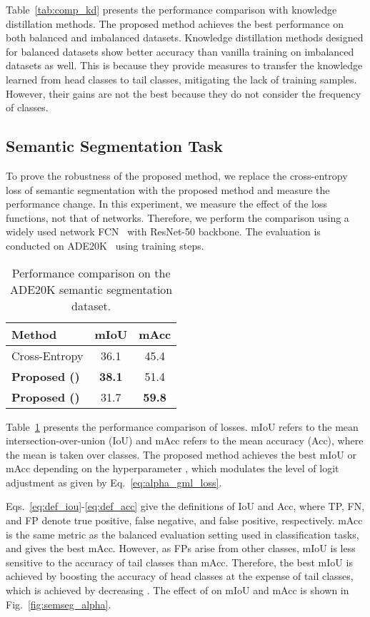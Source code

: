 \documentclass{article}
\theoremstyle{plain}
\theoremstyle{definition}
\theoremstyle{remark}
\begin{document}
Table~\ref{tab:comp_kd} presents the performance comparison with knowledge distillation methods. The proposed method achieves the best performance on both balanced and imbalanced datasets. Knowledge distillation methods designed for balanced datasets show better accuracy than vanilla training on imbalanced datasets as well. This is because they provide measures to transfer the knowledge learned from head classes to tail classes, mitigating the lack of training samples. However, their gains are not the best because they do not consider the frequency of classes.


\subsection{Semantic Segmentation Task}

To prove the robustness of the proposed method, we replace the cross-entropy loss of semantic segmentation with the proposed method and measure the performance change. In this experiment, we measure the effect of the loss functions, not that of networks. Therefore, we perform the comparison using a widely used network FCN~\cite{long2015fully} with ResNet-50 backbone. The evaluation is conducted on ADE20K~\cite{zhou2017scene} using  training steps.

\begin{table}[t]
\centering
\caption{Performance comparison on the ADE20K semantic segmentation dataset.}
\begin{tabular}{l|c|c}
\hline
Method                  & mIoU           & mAcc           \\ \hline
Cross-Entropy           & 36.1          & 45.4          \\
\textbf{Proposed ()} & \textbf{38.1} & 51.4         \\
\textbf{Proposed ()} & 31.7          & \textbf{59.8} \\ \hline
\end{tabular} \label{tab:ade20k}
\end{table}


Table~\ref{tab:ade20k} presents the performance comparison of losses. mIoU refers to the mean intersection-over-union (IoU) and mAcc refers to the mean accuracy (Acc), where the mean is taken over classes. The proposed method achieves the best mIoU or mAcc depending on the hyperparameter , which modulates the level of logit adjustment as given by Eq.~\ref{eq:alpha_gml_loss}.



Eqs.~\ref{eq:def_iou}-\ref{eq:def_acc} give the definitions of IoU and Acc, where TP, FN, and FP denote true positive, false negative, and false positive, respectively. mAcc is the same metric as the balanced evaluation setting used in classification tasks, and  gives the best mAcc. However, as FPs arise from other classes, mIoU is less sensitive to the accuracy of tail classes than mAcc. Therefore, the best mIoU is achieved by boosting the accuracy of head classes at the expense of tail classes, which is achieved by decreasing . The effect of  on mIoU and mAcc is shown in Fig.~\ref{fig:semseg_alpha}.
\end{document}
